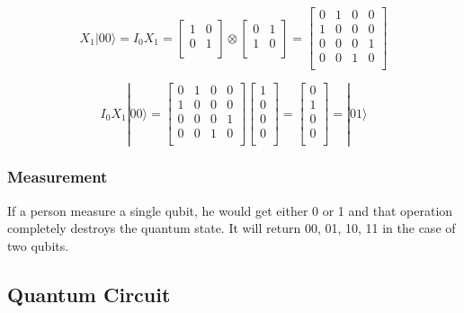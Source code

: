 \begin{equation}
 X_1 |00\rangle = 
I_0X_1 = 
\begin{bmatrix}
1 & 0 \\
0 & 1 \\
\end{bmatrix}
\otimes
\begin{bmatrix}
0 & 1 \\
1 & 0 \\
\end{bmatrix}
= \begin{bmatrix}
0 & 1 & 0 & 0 \\
1 & 0 & 0 & 0 \\
0 & 0 & 0 & 1 \\
0 & 0 & 1 & 0 \\
\end{bmatrix}
\end{equation}

\begin{equation}
I_0 X_1 |00\rangle
=  \begin{bmatrix}
0 & 1 & 0 & 0 \\
1 & 0 & 0 & 0 \\
0 & 0 & 0 & 1 \\
0 & 0 & 1 & 0 \\
\end{bmatrix}
\left[
\begin{array}{c}
1 \\
0 \\
0 \\
0 \\
\end{array}
\right] 
= \left[
\begin{array}{c}
0 \\
1 \\
0 \\
0 \\
\end{array}
\right] 
= |01\rangle
\end{equation}

\subsubsection{Measurement}

If a person measure a single qubit, he would get either 0 or 1 and that operation completely destroys the quantum state.  It will return 00, 01, 10, 11 in the case of two qubits.

\subsection{Quantum Circuit}

